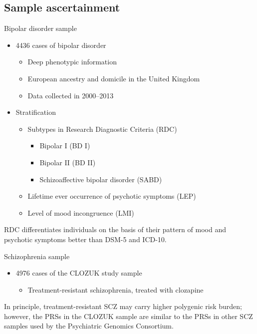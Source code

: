 \documentclass{beamer}
\begin{document}
\subsection{Sample ascertainment}
\begin{frame}{Bipolar disorder sample}
    \begin{itemize}
        \item 4436 cases of bipolar disorder
            \begin{itemize}
                \item Deep phenotypic information
                \item European ancestry and domicile in the United Kingdom
                \item Data collected in 2000--2013
            \end{itemize}
        \item Stratification
            \begin{itemize}
                \item Subtypes in Research Diagnostic Criteria (RDC)
                    \begin{itemize}
                        \item Bipolar I (BD I)
                        \item Bipolar II (BD II)
                        \item Schizoaffective bipolar disorder (SABD)
                    \end{itemize}
                \item Lifetime ever occurrence of psychotic symptoms (LEP)
                \item Level of mood incongruence (LMI)
            \end{itemize}
    \end{itemize}

    RDC differentiates individuals on the basis of their pattern of mood and
    psychotic symptoms better than DSM-5 and ICD-10.
\end{frame}

\begin{frame}{Schizophrenia sample}
    \begin{itemize}
        \item 4976 cases of the CLOZUK study sample
            \begin{itemize}
                \item Treatment-resistant schizophrenia, treated with clozapine
            \end{itemize}
    \end{itemize}

    In principle, treatment-resistant SCZ may carry higher polygenic risk
    burden; however, the PRSs in the CLOZUK sample are similar to the PRSs in
    other SCZ samples used by the Psychiatric Genomics Consortium.
\end{frame}
\end{document}
